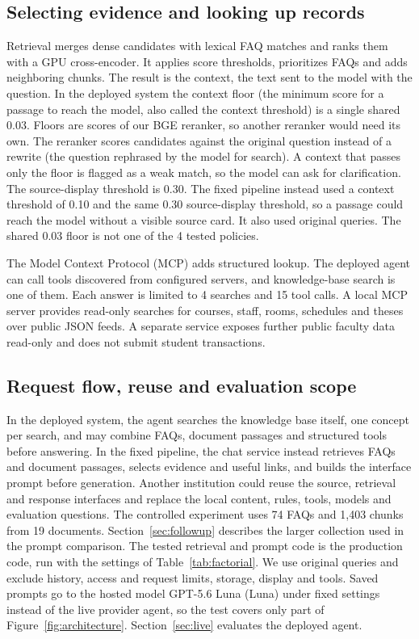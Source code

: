 \documentclass[a4paper,10pt,twocolumn]{article}
\begin{document}
\subsection{Selecting evidence and looking up records}
Retrieval merges dense candidates with lexical FAQ matches and ranks them with a GPU cross-encoder. It applies score thresholds, prioritizes FAQs and adds neighboring chunks. The result is the context, the text sent to the model with the question. In the deployed system the context floor (the minimum score for a passage to reach the model, also called the context threshold) is a single shared 0.03. Floors are scores of our BGE reranker, so another reranker would need its own. The reranker scores candidates against the original question instead of a rewrite (the question rephrased by the model for search). A context that passes only the floor is flagged as a weak match, so the model can ask for clarification. The source-display threshold is 0.30. The fixed pipeline instead used a context threshold of 0.10 and the same 0.30 source-display threshold, so a passage could reach the model without a visible source card. It also used original queries. The shared 0.03 floor is not one of the 4 tested policies.

The Model Context Protocol (MCP) adds structured lookup. The deployed agent can call tools discovered from configured servers, and knowledge-base search is one of them. Each answer is limited to 4 searches and 15 tool calls. A local MCP server provides read-only searches for courses, staff, rooms, schedules and theses over public JSON feeds. A separate service exposes further public faculty data read-only and does not submit student transactions.\subsection{Request flow, reuse and evaluation scope}
In the deployed system, the agent searches the knowledge base itself, one concept per search, and may combine FAQs, document passages and structured tools before answering. In the fixed pipeline, the chat service instead retrieves FAQs and document passages, selects evidence and useful links, and builds the interface prompt before generation. Another institution could reuse the source, retrieval and response interfaces and replace the local content, rules, tools, models and evaluation questions.
The controlled experiment uses 74 FAQs and 1,403 chunks from 19 documents. Section~\ref{sec:followup} describes the larger collection used in the prompt comparison. The tested retrieval and prompt code is the production code, run with the settings of Table~\ref{tab:factorial}. We use original queries and exclude history, access and request limits, storage, display and tools. Saved prompts go to the hosted model GPT-5.6 Luna (Luna) under fixed settings instead of the live provider agent, so the test covers only part of Figure~\ref{fig:architecture}. Section~\ref{sec:live} evaluates the deployed agent.
\end{document}
